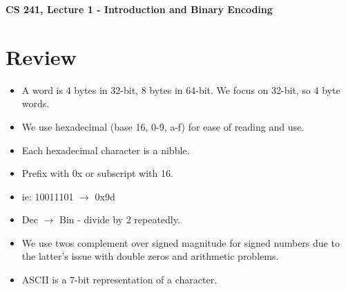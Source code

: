 \documentclass[12pt]{article}
\author{Clement Tsang}
\begin{document}
\begin{center}
\Large\textbf{CS 241, Lecture 1 - Introduction and Binary Encoding}
\end{center}

\section{Review}
\begin{itemize}
    \item A word is 4 bytes in 32-bit, 8 bytes in 64-bit.  We focus on 32-bit, so 4 byte words.
    \item We use hexadecimal (base 16, 0-9, a-f) for ease of reading and use.
    \item Each hexadecimal character is a nibble.
    \item Prefix with 0x or subscript with 16.
    \item ie: 10011101 $\rightarrow$ 0x9d
    \item Dec $\rightarrow$ Bin - divide by 2 repeatedly.
    \item We use twos complement over signed magnitude for signed numbers due to the latter's issue with double zeros and arithmetic problems.
    \item ASCII is a 7-bit representation of a character.
\end{itemize}
\end{document}
